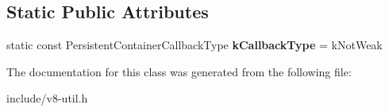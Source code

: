 \subsection*{Static Public Attributes}
\begin{DoxyCompactItemize}
\item 
static const Persistent\+Container\+Callback\+Type {\bfseries k\+Callback\+Type} = k\+Not\+Weak\hypertarget{classv8_1_1_default_global_map_traits_aca4a466a95927f10ea3fa0bff1e041d2}{}\label{classv8_1_1_default_global_map_traits_aca4a466a95927f10ea3fa0bff1e041d2}

\end{DoxyCompactItemize}


The documentation for this class was generated from the following file\+:\begin{DoxyCompactItemize}
\item 
include/v8-\/util.\+h\end{DoxyCompactItemize}
